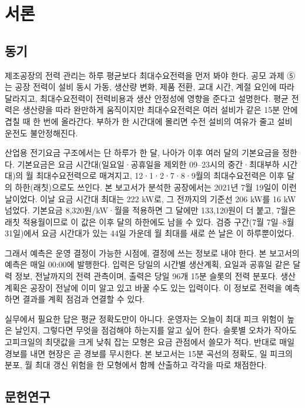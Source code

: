 \section{서론}

\subsection{동기}

제조공장의 전력 관리는 하루 평균보다 최대수요전력을 먼저 봐야 한다. 공모 과제 ⑤는 공장 전력이 설비 동시 가동, 생산량 변화, 제품 전환, 교대 시간, 계절 요인에 따라 달라지고, 최대수요전력이 전력비용과 생산 안정성에 영향을 준다고 설명한다. 평균 전력은 생산량을 따라 완만하게 움직이지만 최대수요전력은 여러 설비가 같은 15분 안에 겹칠 때 한 번에 올라간다. 부하가 한 시간대에 몰리면 수전 설비의 여유가 줄고 설비 운전도 불안정해진다.

산업용 전기요금 구조에서는 단 하루가 한 달, 나아가 이후 여러 달의 기본요금을 정한다. 기본요금은 요금 시간대(일요일·공휴일을 제외한 09--23시의 중간·최대부하 시간대)의 월 최대수요전력으로 매겨지고, 12·1·2·7·8·9월의 최대수요전력은 이후 달의 하한(래칫)으로도 쓰인다. 본 보고서가 분석한 공장에서는 2021년 7월 19일이 이런 날이었다. 이날 요금 시간대 최대는 222 kW로, 그 전까지의 기준선 206 kW를 16 kW 넘었다. 기본요금 8,320원/kW·월을 적용하면 그 달에만 133,120원이 더 붙고, 7월은 래칫 적용월이므로 이 값은 이후 달의 하한에도 남을 수 있다. 검증 구간(7월 7일--8월 31일)에서 요금 시간대가 있는 44일 가운데 월 최대를 새로 쓴 날은 이 하루뿐이었다.

그래서 예측은 운영 결정이 가능한 시점에, 결정에 쓰는 정보로 내야 한다. 본 보고서의 예측은 매일 00:00에 발행한다. 입력은 당일의 시간별 생산계획, 요일과 공휴일 같은 달력 정보, 전날까지의 전력 관측이며, 출력은 당일 96개 15분 슬롯의 전력 분포다. 생산계획은 공장이 전날에 이미 알고 있고 바꿀 수도 있는 입력이다. 이 정보로 전력을 예측하면 결과를 계획 점검과 연결할 수 있다.

실무에서 필요한 답은 평균 정확도만이 아니다. 운영자는 오늘이 최대 피크 위험이 높은 날인지, 그렇다면 무엇을 점검해야 하는지를 알고 싶어 한다. 슬롯별 오차가 작아도 고피크일의 최댓값을 크게 낮춰 잡는 모형은 요금 관점에서 쓸모가 적다. 반대로 매일 경보를 내면 현장은 곧 경보를 무시한다. 본 보고서는 15분 곡선의 정확도, 일 피크의 분포, 월 최대 갱신 위험을 한 모형에서 함께 산출하고 각각을 따로 채점한다.

\subsection{문헌연구}


